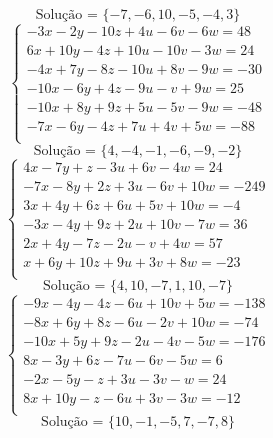 \documentclass[12pt,oneside,a4paper]{article}
\begin{document}
\begin{equation*}
\text{Solução = }\{-7,-6,10,-5,-4,3\}
\end{equation*}
\vspace{\baselineskip}
\begin{equation*}
\begin{cases}
-3x-2y-10z+4u-6v-6w=48 \\
6x+10y-4z+10u-10v-3w=24 \\
-4x+7y-8z-10u+8v-9w=-30 \\
-10x-6y+4z-9u-v+9w=25 \\
-10x+8y+9z+5u-5v-9w=-48 \\
-7x-6y-4z+7u+4v+5w=-88 \\
\end{cases}
\end{equation*}
\begin{equation*}
\text{Solução = }\{4,-4,-1,-6,-9,-2\}
\end{equation*}
\vspace{\baselineskip}
\begin{equation*}
\begin{cases}
4x-7y+z-3u+6v-4w=24 \\
-7x-8y+2z+3u-6v+10w=-249 \\
3x+4y+6z+6u+5v+10w=-4 \\
-3x-4y+9z+2u+10v-7w=36 \\
2x+4y-7z-2u-v+4w=57 \\
x+6y+10z+9u+3v+8w=-23 \\
\end{cases}
\end{equation*}
\begin{equation*}
\text{Solução = }\{4,10,-7,1,10,-7\}
\end{equation*}
\vspace{\baselineskip}
\begin{equation*}
\begin{cases}
-9x-4y-4z-6u+10v+5w=-138 \\
-8x+6y+8z-6u-2v+10w=-74 \\
-10x+5y+9z-2u-4v-5w=-176 \\
8x-3y+6z-7u-6v-5w=6 \\
-2x-5y-z+3u-3v-w=24 \\
8x+10y-z-6u+3v-3w=-12 \\
\end{cases}
\end{equation*}
\begin{equation*}
\text{Solução = }\{10,-1,-5,7,-7,8\}
\end{equation*}
\end{document}

